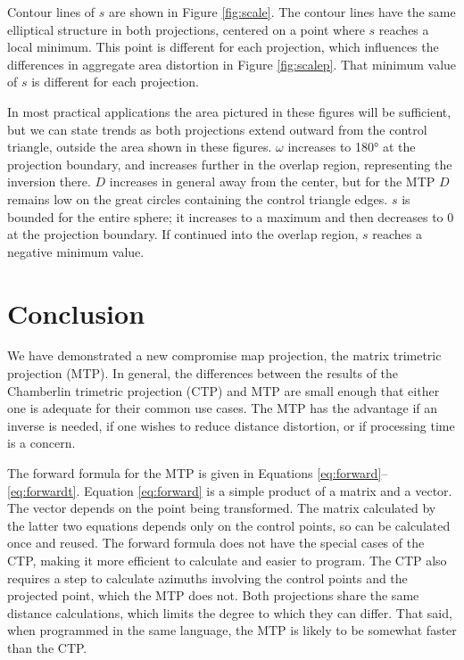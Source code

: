 \documentclass[]{interact}
\begin{document}
Contour lines of $s$ are shown in Figure \ref{fig:scale}.
The contour lines have the same elliptical structure in both projections,
centered on a point where $s$ reaches a local minimum.
This point is different for each projection, which influences
the differences in aggregate area distortion in Figure \ref{fig:scalep}.
That minimum value of $s$ is different for each projection.

In most practical applications the area pictured in these figures will be
sufficient, but we can state trends as both projections extend outward from the
control triangle, outside the area shown in these figures. $\omega$ increases to
180° at the projection boundary, and increases further in the overlap region,
representing the inversion there. $D$ increases in general away from the center,
but for the MTP $D$ remains low on the great circles
containing the control triangle edges. $s$ is bounded for the entire sphere; it
increases to a maximum and then decreases to 0 at the projection boundary. If
continued into the overlap region, $s$ reaches a negative minimum value.

\section{Conclusion}
We have demonstrated a new compromise map projection, the matrix trimetric
projection (MTP). In general, the differences between the results of the
Chamberlin trimetric projection (CTP) and MTP are small enough that either one
is adequate for their common use cases.
The MTP has the advantage if an inverse is needed,
if one wishes to reduce distance distortion, or if processing time is a concern.

The forward formula for the MTP is given in Equations
\ref{eq:forward}--\ref{eq:forwardt}. Equation \ref{eq:forward} is a simple
product of a matrix and a vector. The vector depends on the point being
transformed. The matrix calculated by the latter two equations depends only on
the control points, so can be calculated once and reused. The forward formula
does not have the special cases of the CTP, making it more efficient to
calculate and easier to program. %
The CTP also requires a step to calculate
azimuths involving the control points and the projected point,
which the MTP does not. Both projections share the same distance calculations,
which limits the degree to which they can differ. That said, when programmed in
the same language, the MTP is likely to be somewhat faster than the CTP.
\end{document}
